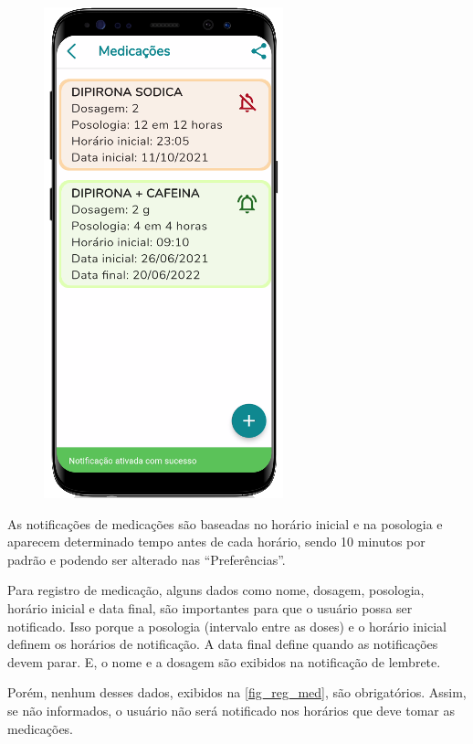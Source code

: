 \begin{figure}[htb]
\begin{minipage}{0.45\textwidth}
        \includegraphics[scale=0.66]{Imagens/desenvolvimento/app/list_med_not.png}
    \end{minipage}
\end{figure}

As notificações de medicações são baseadas no horário inicial e na posologia e aparecem determinado tempo
antes de cada horário, sendo 10 minutos por padrão e podendo ser alterado nas “Preferências”.

Para registro de medicação, alguns dados como nome, dosagem, posologia, horário inicial e data final,
são importantes para que o usuário possa ser notificado. Isso porque a posologia (intervalo entre as doses)
e o horário inicial definem os horários de notificação. A data final define quando as notificações devem
parar. E, o nome e a dosagem são exibidos na notificação de lembrete.

Porém, nenhum desses dados, exibidos na \autoref{fig_reg_med}, são obrigatórios. Assim, se não informados,
o usuário não será notificado nos horários que deve tomar as medicações.

